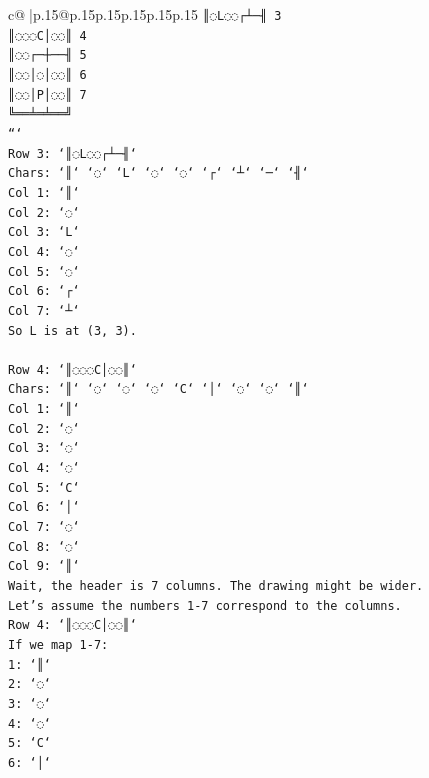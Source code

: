 \documentclass{article}
\begin{document}
{\begin{supertabular}{c@{$\;$}|p{.15\linewidth}@{}p{.15\linewidth}p{.15\linewidth}p{.15\linewidth}p{.15\linewidth}p{.15\linewidth}}
{{{\texttt{║◌L◌◌┌┴─╢ 3} \\
\texttt{║◌◌◌C│◌◌║ 4} \\
\texttt{║◌◌┌─┼──╢ 5} \\
\texttt{║◌◌│◌│◌◌║ 6} \\
\texttt{║◌◌│P│◌◌║ 7} \\
\texttt{╚══╧═╧══╝} \\
\texttt{```} \\
\texttt{Row 3: `║◌L◌◌┌┴─╢`} \\
\texttt{Chars: `║` `◌` `L` `◌` `◌` `┌` `┴` `─` `╢`} \\
\texttt{Col 1: `║`} \\
\texttt{Col 2: `◌`} \\
\texttt{Col 3: `L`} \\
\texttt{Col 4: `◌`} \\
\texttt{Col 5: `◌`} \\
\texttt{Col 6: `┌`} \\
\texttt{Col 7: `┴`} \\
\texttt{So L is at (3, 3).} \\
\\ 
\texttt{Row 4: `║◌◌◌C│◌◌║`} \\
\texttt{Chars: `║` `◌` `◌` `◌` `C` `│` `◌` `◌` `║`} \\
\texttt{Col 1: `║`} \\
\texttt{Col 2: `◌`} \\
\texttt{Col 3: `◌`} \\
\texttt{Col 4: `◌`} \\
\texttt{Col 5: `C`} \\
\texttt{Col 6: `│`} \\
\texttt{Col 7: `◌`} \\
\texttt{Col 8: `◌`} \\
\texttt{Col 9: `║`} \\
\texttt{Wait, the header is 7 columns. The drawing might be wider.} \\
\texttt{Let's assume the numbers 1{-}7 correspond to the columns.} \\
\texttt{Row 4: `║◌◌◌C│◌◌║`} \\
\texttt{If we map 1{-}7:} \\
\texttt{1: `║`} \\
\texttt{2: `◌`} \\
\texttt{3: `◌`} \\
\texttt{4: `◌`} \\
\texttt{5: `C`} \\
\texttt{6: `│`} \\
}}}
\end{supertabular}}
\end{document}
